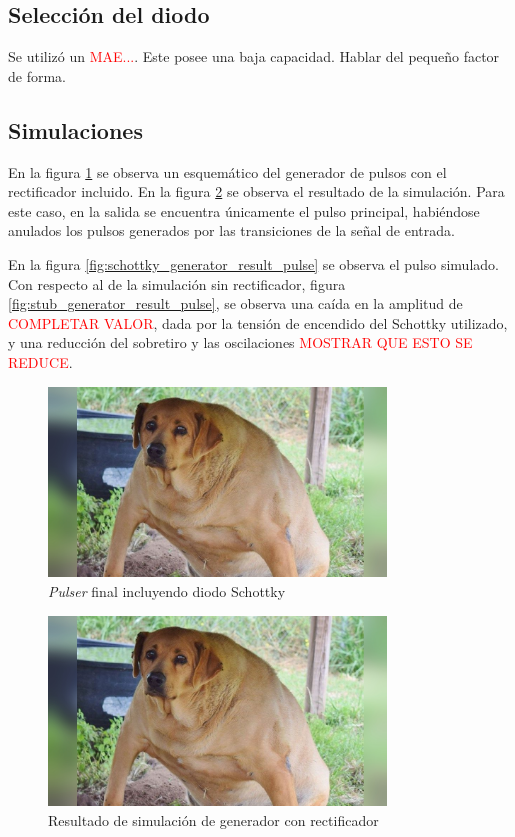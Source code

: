 \subsection{Selección del diodo}

Se utilizó un \textcolor{red}{MAE...}. Este posee una baja capacidad. Hablar del
pequeño factor de forma.

\subsection{Simulaciones}

En la figura \ref{fig:pulser_final_schematic} se observa un esquemático del
generador de pulsos con el rectificador incluido. En la figura
\ref{fig:generator_schottky_result_waves} se observa el resultado de la
simulación. Para este caso, en la salida se encuentra únicamente el pulso
principal, habiéndose anulados los pulsos generados por las transiciones de la
señal de entrada.

En la figura \ref{fig:schottky_generator_result_pulse} se observa el pulso
simulado. Con respecto al de la simulación sin rectificador, figura
\ref{fig:stub_generator_result_pulse}, se observa una caída en la amplitud de
\textcolor{red}{COMPLETAR VALOR}, dada por la tensión de encendido del Schottky
utilizado, y una reducción del sobretiro y las oscilaciones
\textcolor{red}{MOSTRAR QUE ESTO SE REDUCE}.

\begin{figure}[tbp]
    \centering
    \includegraphics[width=0.8\textwidth]{images/placeholder.jpg}
    \caption{\textit{Pulser} final incluyendo diodo Schottky}
    \label{fig:pulser_final_schematic}
\end{figure}

\begin{figure}[tbp]
    \centering
    \includegraphics[width=0.8\textwidth]{images/placeholder.jpg}
    \caption{Resultado de simulación de generador con rectificador}
    \label{fig:generator_schottky_result_waves}
\end{figure}


